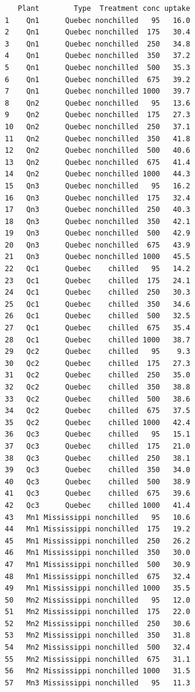 \documentclass[
]{article}
\begin{document}
\begin{verbatim}
   Plant        Type  Treatment conc uptake
1    Qn1      Quebec nonchilled   95   16.0
2    Qn1      Quebec nonchilled  175   30.4
3    Qn1      Quebec nonchilled  250   34.8
4    Qn1      Quebec nonchilled  350   37.2
5    Qn1      Quebec nonchilled  500   35.3
6    Qn1      Quebec nonchilled  675   39.2
7    Qn1      Quebec nonchilled 1000   39.7
8    Qn2      Quebec nonchilled   95   13.6
9    Qn2      Quebec nonchilled  175   27.3
10   Qn2      Quebec nonchilled  250   37.1
11   Qn2      Quebec nonchilled  350   41.8
12   Qn2      Quebec nonchilled  500   40.6
13   Qn2      Quebec nonchilled  675   41.4
14   Qn2      Quebec nonchilled 1000   44.3
15   Qn3      Quebec nonchilled   95   16.2
16   Qn3      Quebec nonchilled  175   32.4
17   Qn3      Quebec nonchilled  250   40.3
18   Qn3      Quebec nonchilled  350   42.1
19   Qn3      Quebec nonchilled  500   42.9
20   Qn3      Quebec nonchilled  675   43.9
21   Qn3      Quebec nonchilled 1000   45.5
22   Qc1      Quebec    chilled   95   14.2
23   Qc1      Quebec    chilled  175   24.1
24   Qc1      Quebec    chilled  250   30.3
25   Qc1      Quebec    chilled  350   34.6
26   Qc1      Quebec    chilled  500   32.5
27   Qc1      Quebec    chilled  675   35.4
28   Qc1      Quebec    chilled 1000   38.7
29   Qc2      Quebec    chilled   95    9.3
30   Qc2      Quebec    chilled  175   27.3
31   Qc2      Quebec    chilled  250   35.0
32   Qc2      Quebec    chilled  350   38.8
33   Qc2      Quebec    chilled  500   38.6
34   Qc2      Quebec    chilled  675   37.5
35   Qc2      Quebec    chilled 1000   42.4
36   Qc3      Quebec    chilled   95   15.1
37   Qc3      Quebec    chilled  175   21.0
38   Qc3      Quebec    chilled  250   38.1
39   Qc3      Quebec    chilled  350   34.0
40   Qc3      Quebec    chilled  500   38.9
41   Qc3      Quebec    chilled  675   39.6
42   Qc3      Quebec    chilled 1000   41.4
43   Mn1 Mississippi nonchilled   95   10.6
44   Mn1 Mississippi nonchilled  175   19.2
45   Mn1 Mississippi nonchilled  250   26.2
46   Mn1 Mississippi nonchilled  350   30.0
47   Mn1 Mississippi nonchilled  500   30.9
48   Mn1 Mississippi nonchilled  675   32.4
49   Mn1 Mississippi nonchilled 1000   35.5
50   Mn2 Mississippi nonchilled   95   12.0
51   Mn2 Mississippi nonchilled  175   22.0
52   Mn2 Mississippi nonchilled  250   30.6
53   Mn2 Mississippi nonchilled  350   31.8
54   Mn2 Mississippi nonchilled  500   32.4
55   Mn2 Mississippi nonchilled  675   31.1
56   Mn2 Mississippi nonchilled 1000   31.5
57   Mn3 Mississippi nonchilled   95   11.3

\end{verbatim}
\end{document}
